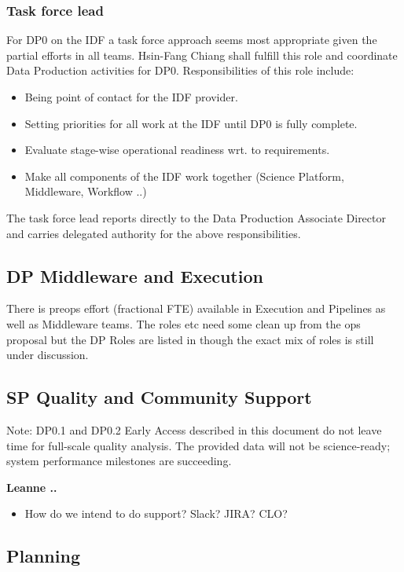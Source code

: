 \subsubsection{Task force lead}\label{sec:tfl}
For DP0 on  the IDF  a task force approach seems most appropriate given the partial efforts in all teams.
Hsin-Fang Chiang shall fulfill this role and coordinate Data Production activities  for DP0.
Responsibilities of this role include:
\begin{itemize}
\item Being point of contact for the IDF provider.
\item Setting priorities for all work at the IDF until DP0 is fully complete.
\item Evaluate stage-wise operational readiness wrt. to requirements.
\item Make all components of the IDF work together (Science Platform, Middleware, Workflow ..)
\end{itemize}

The task force lead reports directly to the Data Production Associate Director and
carries delegated authority for the above responsibilities.


\subsection{DP Middleware and Execution}\label{sec:dp}
There is preops effort (fractional FTE) available in Execution and Pipelines as well as Middleware teams.
The roles etc need some clean up from the ops proposal but the DP Roles are listed in  though the exact mix of roles is still under discussion.


\subsection{SP Quality  and Community Support} \label{sec:sp}

Note: DP0.1 and DP0.2 Early Access described in this document do not leave time for full-scale quality analysis. The provided data will not be science-ready; system performance milestones are succeeding.

{\bf Leanne .. }

\begin{itemize}
\item How do we intend to do support? Slack? JIRA? CLO?
\end{itemize}


\subsection{Planning}


